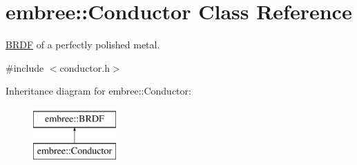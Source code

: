 \hypertarget{classembree_1_1_conductor}{
\section{embree::Conductor Class Reference}
\label{classembree_1_1_conductor}
}


\hyperlink{classembree_1_1_b_r_d_f}{BRDF} of a perfectly polished metal.  




{\ttfamily \#include $<$conductor.h$>$}

Inheritance diagram for embree::Conductor:\begin{figure}[H]
\begin{center}
\leavevmode
\includegraphics[height=2.000000cm]{classembree_1_1_conductor}
\end{center}
\end{figure}
